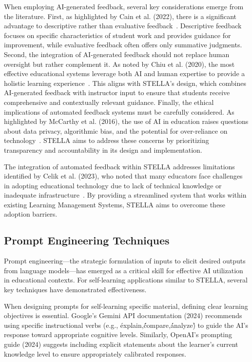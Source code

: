 \documentclass[sigconf,natbib=true]{acmart}
\begin{document}
When employing AI-generated feedback, several key considerations emerge from the literature. First, as highlighted by Cain et al. (2022), there is a significant advantage to descriptive rather than evaluative feedback~\cite{cainDeficienciesTraditionalGrading2022}. Descriptive feedback focuses on specific characteristics of student work and provides guidance for improvement, while evaluative feedback often offers only summative judgments.
Second, the integration of AI-generated feedback should not replace human oversight but rather complement it. As noted by Chiu et al. (2020), the most effective educational systems leverage both AI and human expertise to provide a holistic learning experience~\cite{chiuSustainableCurriculumPlanning2020}. This aligns with STELLA's design, which combines AI-generated feedback with instructor input to ensure that students receive comprehensive and contextually relevant guidance.
Finally, the ethical implications of automated feedback systems must be carefully considered. As highlighted by McCarthy et al. (2016), the use of AI in education raises questions about data privacy, algorithmic bias, and the potential for over-reliance on technology~\cite{mccarthyArtificialIntelligenceTutor2016}. STELLA aims to address these concerns by prioritizing transparency and accountability in its design and implementation.

The integration of automated feedback within STELLA addresses limitations identified by Celik et al. (2023), who noted that many educators face challenges in adopting educational technology due to lack of technical knowledge or inadequate infrastructure~\cite{celikIntelligentTPACKEmpiricalStudy2023}. By providing a streamlined system that works within existing Learning Management Systems, STELLA aims to overcome these adoption barriers.

\subsection{Prompt Engineering Techniques}
Prompt engineering—the strategic formulation of inputs to elicit desired outputs from language models—has emerged as a critical skill for effective AI utilization in educational contexts. For self-learning applications similar to STELLA, several key techniques have demonstrated effectiveness.

When designing prompts for self-learning specific material, defining clear learning objectives is essential. Google's Gemini API documentation (2024) recommends using specific instructional verbs (e.g., \'explain,\' \'compare,\' \'analyze\') to guide the AI's response toward appropriate cognitive levels. Similarly, OpenAI's prompting guide (2024) suggests including explicit statements about the learner's current knowledge level to ensure appropriately calibrated responses.
\end{document}
